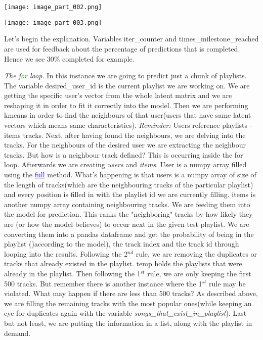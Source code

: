 \documentclass[]{article}
\begin{document}
\begin{description}
\texttt{[image: image\_part\_002.png]}

\texttt{[image: image\_part\_003.png]}

Let's begin the explanation. Variables iter\_counter and times\_milestone\_reached are used for feedback about the percentage of predictions that is completed. Hence we see 30\% completed for example.

\textit{The \textcolor{Green}{for} loop.} In this instance we are going to predict just a chunk of playlists. The variable desired\_user\_id is the current playlist we are working on. We are getting the specific user's vector from the whole latent matrix and we are reshaping it in order to fit it correctly into the model. Then we are performing kmeans in order to find the neighbours of that user(users that have same latent vectors which means same characteristics). \textit{Reminder: } Users reference playlists - items tracks.
Next, after having found the neighbours, we are delving into the tracks. For the neighbours of the desired user we are extracting the neighbour tracks. But how is a neighbour track defined? This is occurring inside the for loop.
Afterwards we are creating \textit{users} and \textit{items}. User is a numpy array filled using the \href{https://numpy.org/doc/stable/reference/generated/numpy.full.html}{\textcolor{Blue}{full}} method. What's happening is that users is a numpy array of size of the length of tracks(which are the neighbouring tracks of the particular playlist) and every position is filled in with the playlist id we are currently filling. items is another numpy array containing neighbouring tracks. We are feeding them into the model for prediction. This ranks the "neighboring" tracks by how likely they are (or how the model believes) to occur next in the given test playlist.
We are converting them into a pandas dataframe and get the probability of being in the playlist ()according to the model), the track index and the track id through looping into the results.
Following the 2$^{nd}$ rule, we are removing the duplicates or tracks that already existed in the playlist. temp holds the playlists that were already in the playlist. Then following the 1$^{st}$ rule, we are only keeping the first 500 tracks. But remember there is another instance where the 1$^{st}$ rule may be violated. What may happen if there are less than 500 tracks? As described above, we are filling the remaining tracks with the most popular ones(while keeping an eye for duplicates again with the variable \textit{songs\_that\_exist\_in\_playlist}). Last but not least, we are putting the information in a list, along with the playlist in demand.


\end{description}
\end{document}
